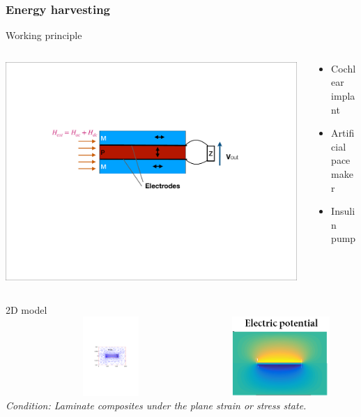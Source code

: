 \documentclass[compress]{beamer}
\begin{document}
\begin{frame}\frametitle{Energy harvesting}
\vspace{-10.5pt}
\begin{block}{Working principle}
\begin{columns}[totalwidth=\textwidth] 
   \begin{column}{.69\textwidth}
\includegraphics[width=0.99\textwidth]{Graphic/01_energharveprinc.pdf}
	\end{column}
	\begin{column}{.3\textwidth}
	\begin{itemize}[label=$\bullet$, font=\small, leftmargin=*]
	\item Cochlear implant
	\item Artificial pacemaker
	\item Insulin pump
	\end{itemize}
	\end{column}
\end{columns}
\end{block}
2D model\\
    {
     \includegraphics[height=3cm, width=0.6\textwidth]{Graphic/01_2dmesh.pdf}
     \includegraphics[height=3cm, width=0.35\textwidth]{Graphic/01_2dresult.png}
    }
    {\color{red}\textit{Condition: Laminate composites under the plane strain or stress state.}}
\end{frame}
\end{document}
